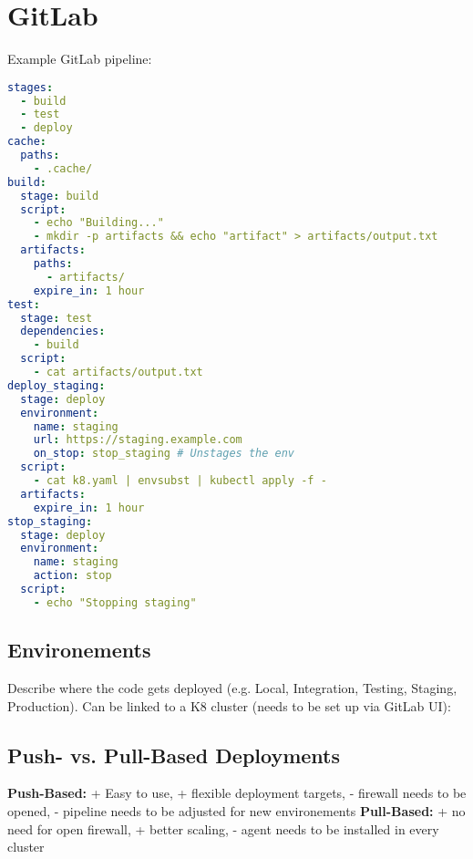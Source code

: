 \section{GitLab}
Example GitLab pipeline:
\begin{lstlisting}[language=yaml]
stages:
  - build
  - test
  - deploy
cache:
  paths:
    - .cache/
build:
  stage: build
  script:
    - echo "Building..."
    - mkdir -p artifacts && echo "artifact" > artifacts/output.txt
  artifacts:
    paths:
      - artifacts/
    expire_in: 1 hour
test:
  stage: test
  dependencies:
    - build
  script:
    - cat artifacts/output.txt
deploy_staging:
  stage: deploy
  environment:
    name: staging
    url: https://staging.example.com
    on_stop: stop_staging # Unstages the env
  script:
    - cat k8.yaml | envsubst | kubectl apply -f -
  artifacts:
    expire_in: 1 hour
stop_staging:
  stage: deploy
  environment:
    name: staging
    action: stop
  script:
    - echo "Stopping staging"
\end{lstlisting}
\subsection{Environements}
Describe where the code gets deployed (e.g. Local, Integration, Testing, Staging, Production). Can be linked to a K8 cluster (needs to be set up via GitLab UI):
\subsection{Push- vs. Pull-Based Deployments}
\textbf{Push-Based:} + Easy to use, + flexible deployment targets, - firewall needs to be opened, - pipeline needs to be adjusted for new environements \textbf{Pull-Based:} + no need for open firewall, + better scaling, - agent needs to be installed in every cluster

